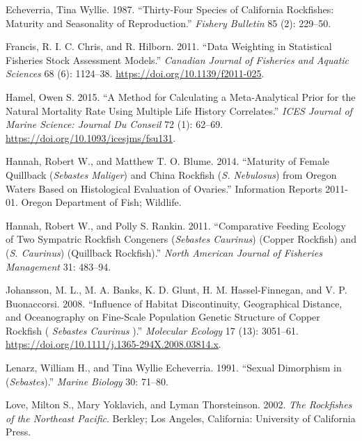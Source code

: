 \documentclass[11pt,
  english,
  a4paper,
]{article}
\begin{document}
\leavevmode\hypertarget{ref-Echeverria_maturity_1987}{}%
Echeverria, Tina Wyllie. 1987. ``Thirty-Four Species of California Rockfishes: Maturity and Seasonality of Reproduction.'' \emph{Fishery Bulletin} 85 (2): 229--50.

\leavevmode\hypertarget{ref-francis_data_2011}{}%
Francis, R. I. C. Chris, and R. Hilborn. 2011. ``Data Weighting in Statistical Fisheries Stock Assessment Models.'' \emph{Canadian Journal of Fisheries and Aquatic Sciences} 68 (6): 1124--38. \url{https://doi.org/10.1139/f2011-025}.

\leavevmode\hypertarget{ref-hamel_method_2015}{}%
Hamel, Owen S. 2015. ``A Method for Calculating a Meta-Analytical Prior for the Natural Mortality Rate Using Multiple Life History Correlates.'' \emph{ICES Journal of Marine Science: Journal Du Conseil} 72 (1): 62--69. \url{https://doi.org/10.1093/icesjms/fsu131}.

\leavevmode\hypertarget{ref-HannahandBlume_maturity_2011}{}%
Hannah, Robert W., and Matthew T. O. Blume. 2014. ``Maturity of Female Quillback (\emph{Sebastes Maliger}) and China Rockfish (\emph{S. Nebulosus}) from Oregon Waters Based on Histological Evaluation of Ovaries.'' Information Reports 2011-01. Oregon Department of Fish; Wildlife.

\leavevmode\hypertarget{ref-HannahandRankin_rockfish_site_fidelity_2011}{}%
Hannah, Robert W., and Polly S. Rankin. 2011. ``Comparative Feeding Ecology of Two Sympatric Rockfish Congeners (\emph{Sebastes Caurinus}) (Copper Rockfish) and (\emph{S. Caurinus}) (Quillback Rockfish).'' \emph{North American Journal of Fisheries Management} 31: 483--94.

\leavevmode\hypertarget{ref-johansson_influence_2008}{}%
Johansson, M. L., M. A. Banks, K. D. Glunt, H. M. Hassel-Finnegan, and V. P. Buonaccorsi. 2008. ``Influence of Habitat Discontinuity, Geographical Distance, and Oceanography on Fine-Scale Population Genetic Structure of Copper Rockfish ( \emph{Sebastes Caurinus} ).'' \emph{Molecular Ecology} 17 (13): 3051--61. \url{https://doi.org/10.1111/j.1365-294X.2008.03814.x}.

\leavevmode\hypertarget{ref-LenarzandEcheverria_dimorphism_1991}{}%
Lenarz, William H., and Tina Wyllie Echeverria. 1991. ``Sexual Dimorphism in (\emph{Sebastes}).'' \emph{Marine Biology} 30: 71--80.

\leavevmode\hypertarget{ref-loveetal_2002}{}%
Love, Milton S., Mary Yoklavich, and Lyman Thorsteinson. 2002. \emph{The Rockfishes of the Northeast Pacific}. Berkley; Los Angeles, California: University of California Press.
\end{document}
